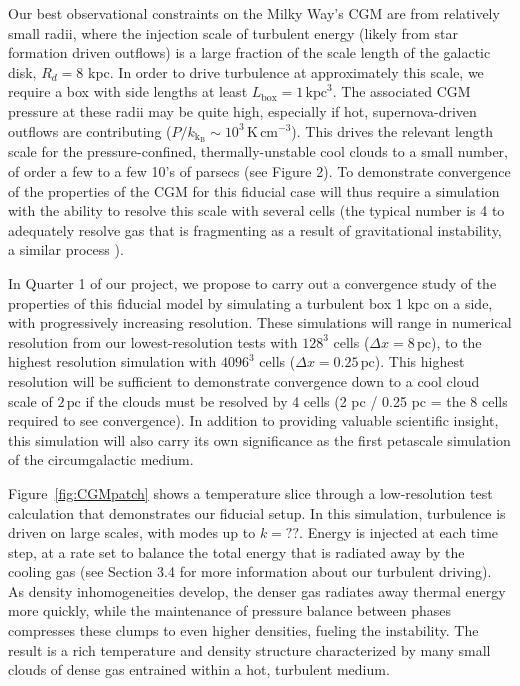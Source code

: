 \documentclass[11pt,letterpaper,english]{article}
\begin{document}
Our best observational constraints on the Milky Way's CGM are from relatively small radii, where the injection scale of turbulent energy (likely from star formation driven outflows) is a large fraction of the scale length of the galactic disk, $R_d = 8$ kpc. In order to drive turbulence at approximately this scale, we require a box with side lengths at least $L_\mathrm{box} = 1\,\mathrm{kpc}^{3}$. The associated CGM pressure at these radii may be quite high, especially if hot, supernova-driven outflows are contributing ($P/k_\mathrm{k_B} \sim 10^3\,\mathrm{K}\,\mathrm{cm}^{-3}$). This drives the relevant length scale for the pressure-confined, thermally-unstable cool clouds to a small number, of order a few to a few 10's of parsecs (see Figure 2). To demonstrate convergence of the properties of the CGM for this fiducial case will thus require a simulation with the ability to resolve this scale with several cells (the typical number is 4 to adequately resolve gas that is fragmenting as a result of gravitational instability, a similar process \cite{Truelove}).

In Quarter 1 of our project, we propose to carry out a convergence study of the properties of this fiducial model by simulating a turbulent box 1 kpc on a side, with progressively increasing resolution. These simulations will range in numerical resolution from our lowest-resolution tests with $128^3$ cells ($\Delta x = 8\,\mathrm{pc}$), to the highest resolution simulation with $4096^3$ cells ($\Delta x = 0.25\,\mathrm{pc}$). This highest resolution will be sufficient to demonstrate convergence down to a cool cloud scale of $2\,\mathrm{pc}$ if the clouds must be resolved by 4 cells (2 pc / 0.25 pc = the 8 cells required to see convergence). In addition to providing valuable scientific insight, this simulation will also carry its own significance as the first petascale simulation of the circumgalactic medium.

Figure~\ref{fig:CGMpatch} shows a temperature slice through a low-resolution test calculation that demonstrates our fiducial setup. In this simulation, turbulence is driven on large scales, with modes up to $k = ??$. Energy is injected at each time step, at a rate set to balance the total energy that is radiated away by the cooling gas (see Section 3.4 for more information about our turbulent driving). As density inhomogeneities develop, the denser gas radiates away thermal energy more quickly, while the maintenance of pressure balance between phases compresses these clumps to even higher densities, fueling the instability. The result is a rich temperature and density structure characterized by many small clouds of dense gas entrained within a hot, turbulent medium.
\end{document}
